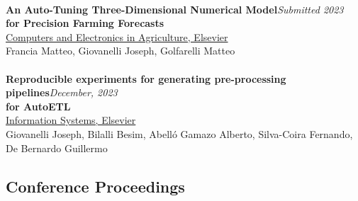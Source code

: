 \\
\textbf{An Auto-Tuning Three-Dimensional Numerical Model}\hfill \textit{Submitted 2023}\\
\textbf{for Precision Farming Forecasts}\\
\underline{Computers and Electronics in Agriculture, Elsevier}\\
Francia Matteo, Giovanelli Joseph, Golfarelli Matteo\\
\\
\textbf{Reproducible experiments for generating pre-processing pipelines}\hfill \textit{December, 2023}\\
\textbf{for AutoETL}\\
\underline{Information Systems, Elsevier}\\
Giovanelli Joseph, Bilalli Besim, Abelló Gamazo Alberto, Silva-Coira Fernando, De Bernardo Guillermo

\subsection*{Conference Proceedings}

